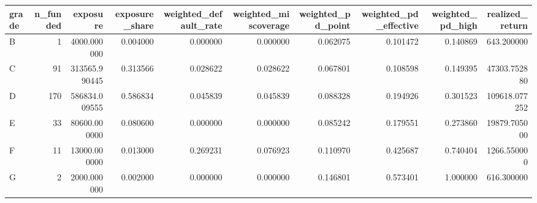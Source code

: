 \begin{tabular}{lrrrrrrrrr}
\toprule
grade & n\_funded & exposure & exposure\_share & weighted\_default\_rate & weighted\_miscoverage & weighted\_pd\_point & weighted\_pd\_effective & weighted\_pd\_high & realized\_return \\
\midrule
B & 1 & 4000.000000 & 0.004000 & 0.000000 & 0.000000 & 0.062075 & 0.101472 & 0.140869 & 643.200000 \\
C & 91 & 313565.990445 & 0.313566 & 0.028622 & 0.028622 & 0.067801 & 0.108598 & 0.149395 & 47303.752880 \\
D & 170 & 586834.009555 & 0.586834 & 0.045839 & 0.045839 & 0.088328 & 0.194926 & 0.301523 & 109618.077252 \\
E & 33 & 80600.000000 & 0.080600 & 0.000000 & 0.000000 & 0.085242 & 0.179551 & 0.273860 & 19879.705000 \\
F & 11 & 13000.000000 & 0.013000 & 0.269231 & 0.076923 & 0.110970 & 0.425687 & 0.740404 & 1266.550000 \\
G & 2 & 2000.000000 & 0.002000 & 0.000000 & 0.000000 & 0.146801 & 0.573401 & 1.000000 & 616.300000 \\
\bottomrule
\end{tabular}
